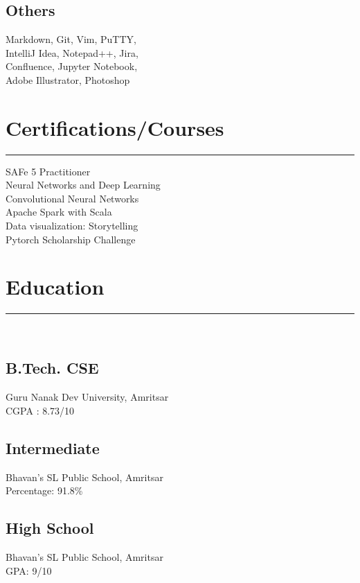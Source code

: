 \documentclass[]{puneet-resume}
\begin{document}
\begin{minipage}[t]{0.33\textwidth}
\subsection{Others}
Markdown, Git, Vim, PuTTY,\\
IntelliJ Idea, Notepad++, Jira,\\
Confluence, Jupyter Notebook,\\
Adobe Illustrator, Photoshop
\sectionsep
\section{Certifications/Courses}
\noindent\rule{5cm}{0.4pt}

SAFe 5 Practitioner\\
Neural Networks and Deep Learning\\
Convolutional Neural Networks\\
Apache Spark with Scala\\
Data visualization: Storytelling\\
Pytorch Scholarship Challenge
\sectionsep
\section{Education} 
\noindent\rule{5cm}{0.4pt}\\
\subsection{B.Tech. CSE}
Guru Nanak Dev University, Amritsar\\
CGPA : 8.73/10\\
\vspace{8pt}
\subsection{Intermediate}
Bhavan's SL Public School, Amritsar\\
Percentage: 91.8\%\\
\vspace{8pt}
\subsection{High School}
Bhavan's SL Public School, Amritsar\\
GPA: 9/10
\sectionsep
%
%

\end{minipage} 
\end{document}
